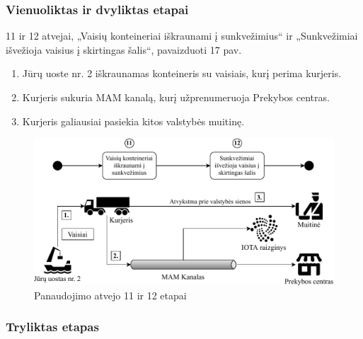 
\subsubsection{Vienuoliktas ir dvyliktas etapai}

11 ir 12 atvejai, „Vaisių konteineriai iškraunami į sunkvežimius“ ir „Sunkvežimiai išvežioja vaisius į skirtingas šalis“, pavaizduoti 17 pav.
\begin{enumerate}
    \item Jūrų uoste nr. 2 iškraunamas konteineris su vaisiais, kurį perima kurjeris.
    \item Kurjeris sukuria MAM kanalą, kurį užprenumeruoja Prekybos centras.
    \item Kurjeris galiausiai pasiekia kitos valstybės muitinę.
\end{enumerate}

\begin{figure}[H]
    \centering
    \includegraphics[scale=0.7]{images/iota-usecase-11-12}
    \caption{Panaudojimo atvejo 11 ir 12 etapai}
\end{figure}




\subsubsection{Tryliktas etapas}

